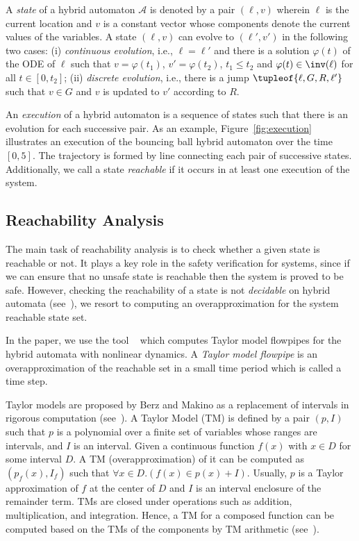 A \emph{state} of a hybrid automaton $\mathcal{A}$ is denoted by a pair $(\ell, v)$ wherein $\ell$ is the current location and $v$ is a constant vector whose components denote the current values of the variables. A state $(\ell,v)$ can evolve to $(\ell', v')$ in the following two cases: (i) \emph{continuous evolution}, i.e., $\ell = \ell'$ and there is a solution $\varphi(t)$ of the ODE of $\ell$ such that $v = \varphi(t_1)$, $v' = \varphi(t_2)$, $t_1 \leq t_2$ and $\varphi(t) \in \inv(\ell)$ for all $t \in [0,t_2]$; (ii) \emph{discrete evolution}, i.e., there is a jump $\tupleof{\ell, G, R, \ell'}$ such that $v\in G$ and $v$ is updated to $v'$ according to $R$.

An \emph{execution} of a hybrid automaton is a sequence of states such that there is an evolution for each successive pair. As an example, Figure~\ref{fig:execution} illustrates an execution of the bouncing ball hybrid automaton over the time $[0,5]$. The trajectory is formed by line connecting each pair of successive states. Additionally, we call a state \emph{reachable} if it occurs in at least one execution of the system.




\subsection{Reachability Analysis}

The main task of reachability analysis is to check whether a given state is reachable or not. It plays a key role in the safety verification for systems, since if we can ensure that no unsafe state is reachable then the system is proved to be safe. However, checking the reachability of a state is not \emph{decidable} on hybrid automata (see~\cite{Alur+/1995/hybrid_systems}), we resort to computing an overapproximation for the system reachable state set.


In the paper, we use the tool \flowstar~\cite{Chen+/2013/flowstar} which computes Taylor model flowpipes for the hybrid automata with nonlinear dynamics. A \emph{Taylor model flowpipe} is an overapproximation of the reachable set in a small time period which is called a time step.


Taylor models are proposed by Berz and Makino as a replacement of intervals in rigorous computation (see~\cite{Berz/1999/Modern,Makino+Berz/2003/Taylor}). A Taylor Model (TM) is defined by a pair $(p,I)$ such that $p$ is a polynomial over a finite set of variables whose ranges are intervals, and $I$ is an interval. Given a continuous function $f(x)$ with $x\in D$ for some interval $D$. A TM (overapproximation) of it can be computed as $(p_f(x), I_f)$ such that $\forall x\in D.(f(x) \in p(x) + I)$. Usually, $p$ is a Taylor approximation of $f$ at the center of $D$ and $I$ is an interval enclosure of the remainder term. TMs are closed under operations such as addition, multiplication, and integration. Hence, a TM for a composed function can be computed based on the TMs of the components by TM arithmetic (see~\cite{Makino+Berz/2003/Taylor}).


